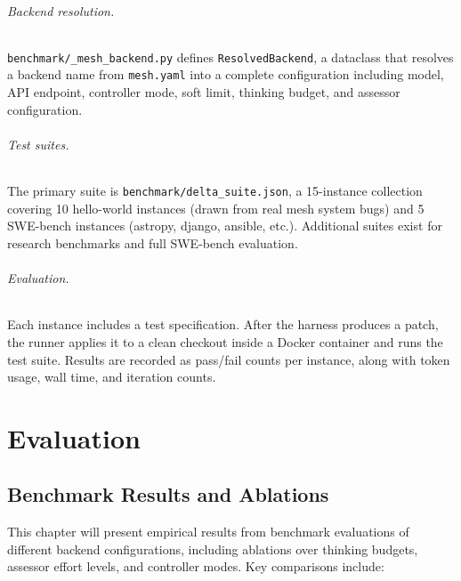 \documentclass[11pt,letterpaper]{report}
\newcommand{\code}[1]{\texttt{#1}}
\begin{document}
\paragraph{Backend resolution.}
\code{benchmark/\_mesh\_backend.py} defines \code{ResolvedBackend}, a
dataclass that resolves a backend name from \code{mesh.yaml} into a
complete configuration including model, API endpoint, controller mode,
soft limit, thinking budget, and assessor configuration.

\paragraph{Test suites.}
The primary suite is \code{benchmark/delta\_suite.json}, a 15-instance
collection covering 10 hello-world instances (drawn from real mesh
system bugs) and 5 SWE-bench instances (astropy, django, ansible, etc.).
Additional suites exist for research benchmarks and full SWE-bench
evaluation.

\paragraph{Evaluation.}
Each instance includes a test specification. After the harness produces
a patch, the runner applies it to a clean checkout inside a Docker
container and runs the test suite. Results are recorded as pass/fail
counts per instance, along with token usage, wall time, and iteration
counts.


\part{Evaluation}
\label{part:evaluation}

\chapter{Benchmark Results and Ablations}
\label{ch:results}

This chapter will present empirical results from benchmark evaluations
of different backend configurations, including ablations over thinking
budgets, assessor effort levels, and controller modes. Key comparisons
include:
\end{document}
